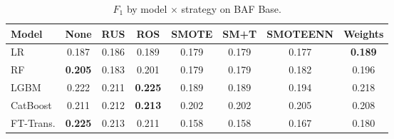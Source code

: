 \begin{table}[H]
\centering
\caption{$F_1$ by model $\times$ strategy on BAF Base.}
\label{tab:factorial_baf_f1}
\begin{tabular}{l c c c c c c c}
\toprule
Model & None & RUS & ROS & SMOTE & SM+T & SMOTEENN & Weights \\
\midrule
LR         & 0.187 & 0.186 & 0.189 & 0.179 & 0.179 & 0.177 & \textbf{0.189} \\
RF         & \textbf{0.205} & 0.183 & 0.201 & 0.179 & 0.179 & 0.182 & 0.196 \\
LGBM       & 0.222 & 0.211 & \textbf{0.225} & 0.189 & 0.189 & 0.194 & 0.218 \\
CatBoost   & 0.211 & 0.212 & \textbf{0.213} & 0.202 & 0.202 & 0.205 & 0.208 \\
FT-Trans.  & \textbf{0.225} & 0.213 & 0.211 & 0.158 & 0.158 & 0.167 & 0.180 \\
\bottomrule
\end{tabular}
\end{table}